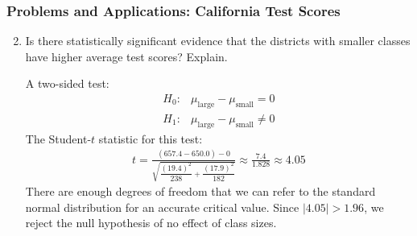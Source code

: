 \begin{frame}
\frametitle{Problems and Applications: California Test Scores}

\begin{enumerate}\setcounter{enumi}{1}

\item Is there statistically significant evidence that the districts with smaller classes have higher average test scores? Explain.

\begin{answer}
A two-sided test:
\begin{align*}
H_{0} \colon & \mu_{\text{large}} - \mu_{\text{small}} = 0\\
H_{1} \colon & \mu_{\text{large}} - \mu_{\text{small}} \ne 0
\end{align*}
The Student-$t$ statistic for this test:
\begin{align*}
t   = \frac{(657.4-650.0)-0}{\sqrt{\dfrac{(19.4)^{2}}{238}+\dfrac{(17.9)^{2}}{182}}}
    \approx \frac{7.4}{1.828}
    \approx 4.05
\end{align*}
There are enough degrees of freedom that we can refer to the standard normal distribution for an accurate critical value.
Since $|4.05| > 1.96$, we reject the null hypothesis of no effect of class sizes.
\end{answer}

\end{enumerate}
\end{frame}


